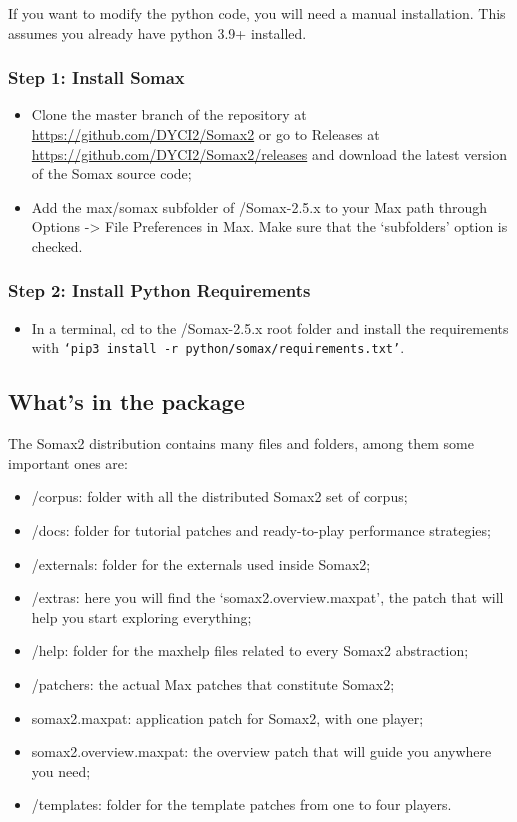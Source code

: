 If you want to modify the python code, you will need a manual installation. This assumes you already have python 3.9+ installed.

\subsubsection{Step 1: Install Somax}

\begin{itemize}
    \item Clone the master branch of the repository at \url{https://github.com/DYCI2/Somax2} or go to Releases at \url{https://github.com/DYCI2/Somax2/releases} and download the latest version of the Somax source code;
    \item Add the max/somax subfolder of /Somax-2.5.x to your Max path through Options -> File Preferences in Max. Make sure that the `subfolders' option is checked.
\end{itemize}

\subsubsection{Step 2: Install Python Requirements}

\begin{itemize}
    \item In a terminal, cd to the /Somax-2.5.x root folder and install the requirements with \texttt{`pip3 install -r python/somax/requirements.txt'}.
\end{itemize}



\subsection{What's in the package}

The Somax2 distribution contains many files and folders, among them some important ones are:

\begin{itemize}
    \item /corpus: folder with all the distributed Somax2 set of corpus;
    \item /docs: folder for tutorial patches and ready-to-play performance strategies;
    \item /externals: folder for the externals used inside Somax2;
    \item /extras: here you will find the `somax2.overview.maxpat', the patch that will help you start exploring everything;
    \item /help: folder for the maxhelp files related to every Somax2 abstraction;
    \item /patchers: the actual Max patches that constitute Somax2;
    \item somax2.maxpat: application patch for Somax2, with one player;
    \item somax2.overview.maxpat: the overview patch that will guide you anywhere you need;
    \item /templates: folder for the template patches from one to four players.
\end{itemize}

